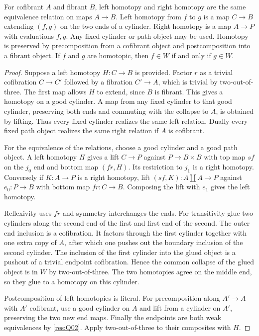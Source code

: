 \begin{theorem}\label{res:Q03}
For cofibrant \(A\) and fibrant \(B\), left homotopy and right
homotopy are the same equivalence relation on maps \(A\to B\).
Left homotopy from \(f\) to \(g\) is a map \(C\to B\) extending
\((f,g)\) on the two ends of a cylinder. Right homotopy is a
map \(A\to P\) with evaluations \(f,g\). Any fixed cylinder
or path object may be used. Homotopy is preserved by
precomposition from a cofibrant object and postcomposition
into a fibrant object. If \(f\) and \(g\) are homotopic,
then \(f\in W\) if and only if \(g\in W\).
\end{theorem}
\begin{proof}
Suppose a left homotopy \(H:C\to B\) is provided. Factor \(r\)
as a trivial cofibration \(C\to C'\) followed by a fibration
\(C'\to A\), which is trivial by two-out-of-three. The first map
allows \(H\) to extend, since \(B\) is fibrant. This gives a
homotopy on a good cylinder. A map from any fixed cylinder to
that good cylinder, preserving both ends and commuting with the
collapse to \(A\), is obtained by lifting. Thus every fixed
cylinder realizes the same left relation. Dually every fixed
path object realizes the same right relation if \(A\) is
cofibrant.

For the equivalence of the relations, choose a good cylinder
and a good path object. A left homotopy \(H\) gives a lift
\(C\to P\) against \(P\to B\times B\) with top map \(s f\)
on the \(j_0\) end and bottom map \((fr,H)\).
Its restriction to \(j_1\) is a right homotopy. Conversely
if \(K:A\to P\) is a right homotopy, lift
\((s f,K):A\amalg A\to P\) against \(e_0:P\to B\)
with bottom map \(fr:C\to B\). Composing the lift with
\(e_1\) gives the left homotopy.

Reflexivity uses \(fr\) and symmetry interchanges the ends.
For transitivity glue two cylinders along the second end
of the first and first end of the second. The outer end
inclusion is a cofibration. It factors through the first
cylinder together with one extra copy of \(A\), after which
one pushes out the boundary inclusion of the second cylinder.
The inclusion of the first cylinder into the glued object
is a pushout of a trivial endpoint cofibration. Hence the
common collapse of the glued object is in \(W\) by
two-out-of-three. The two homotopies agree on the middle end,
so they glue to a homotopy on this cylinder.

Postcomposition of left homotopies is literal. For
precomposition along \(A'\to A\) with \(A'\) cofibrant,
use a good cylinder on \(A\) and lift from a cylinder on
\(A'\), preserving the two new end maps. Finally the
endpoints are both weak equivalences by \ref{res:Q02}.
Apply two-out-of-three to their composites with \(H\).
\end{proof}

